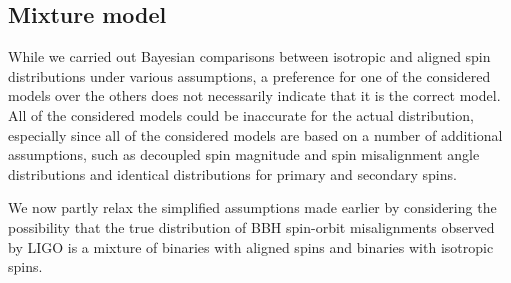 \documentclass{nature-arxiv}
\begin{document}
\begin{methods}
\section{Mixture model}

While we carried out Bayesian comparisons between isotropic and aligned spin distributions under various assumptions, a preference for one of the considered models over the others does not necessarily indicate that it is the correct model.  All of the considered models could be inaccurate for the actual distribution, especially since all of the considered models are based on a number of additional assumptions, such as decoupled spin magnitude and spin misalignment angle distributions and identical distributions for primary and secondary spins.

We now partly relax the simplified assumptions made earlier by considering the possibility that the true distribution of BBH spin-orbit misalignments observed by LIGO is a mixture of binaries with aligned spins and binaries with isotropic spins.

%
%

%


\end{methods}
\end{document}
